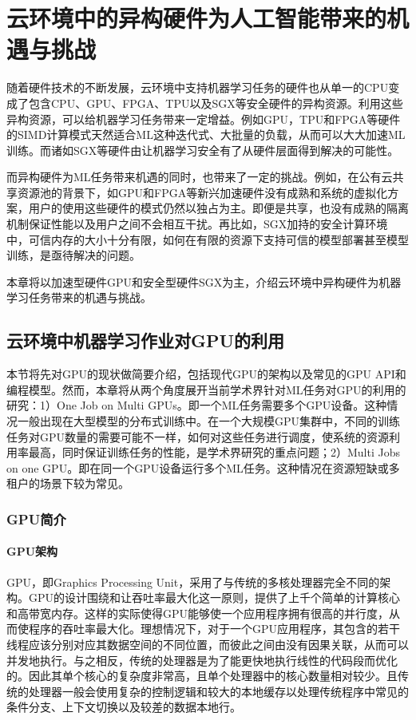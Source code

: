 
\chapter{云环境中的异构硬件为人工智能带来的机遇与挑战}
随着硬件技术的不断发展，云环境中支持机器学习任务的硬件也从单一的CPU变成了包含CPU、GPU、FPGA、TPU以及SGX等安全硬件的异构资源。利用这些异构资源，可以给机器学习任务带来一定增益。例如GPU，TPU和FPGA等硬件的SIMD计算模式天然适合ML这种迭代式、大批量的负载，从而可以大大加速ML训练。而诸如SGX等硬件由让机器学习安全有了从硬件层面得到解决的可能性。

而异构硬件为ML任务带来机遇的同时，也带来了一定的挑战。例如，在公有云共享资源池的背景下，如GPU和FPGA等新兴加速硬件没有成熟和系统的虚拟化方案，用户的使用这些硬件的模式仍然以独占为主。即便是共享，也没有成熟的隔离机制保证性能以及用户之间不会相互干扰。再比如，SGX加持的安全计算环境中，可信内存的大小十分有限，如何在有限的资源下支持可信的模型部署甚至模型训练，是亟待解决的问题。

本章将以加速型硬件GPU和安全型硬件SGX为主，介绍云环境中异构硬件为机器学习任务带来的机遇与挑战。

\section{云环境中机器学习作业对GPU的利用}

本节将先对GPU的现状做简要介绍，包括现代GPU的架构以及常见的GPU API和编程模型。然而，本章将从两个角度展开当前学术界针对ML任务对GPU的利用的研究：1）One Job on Multi GPUs。即一个ML任务需要多个GPU设备。这种情况一般出现在大型模型的分布式训练中。在一个大规模GPU集群中，不同的训练任务对GPU数量的需要可能不一样，如何对这些任务进行调度，使系统的资源利用率最高，同时保证训练任务的性能，是学术界研究的重点问题；2）Multi Jobs on one GPU。即在同一个GPU设备运行多个ML任务。这种情况在资源短缺或多租户的场景下较为常见。

\subsection{GPU简介}

\subsubsection{GPU架构}
GPU，即Graphics Processing Unit，采用了与传统的多核处理器完全不同的架构。GPU的设计围绕和让吞吐率最大化这一原则，提供了上千个简单的计算核心和高带宽内存。这样的实际使得GPU能够使一个应用程序拥有很高的并行度，从而使程序的吞吐率最大化。理想情况下，对于一个GPU应用程序，其包含的若干线程应该分别对应其数据空间的不同位置，而彼此之间由没有因果关联，从而可以并发地执行。与之相反，传统的处理器是为了能更快地执行线性的代码段而优化的。因此其单个核心的复杂度非常高，且单个处理器中的核心数量相对较少。且传统的处理器一般会使用复杂的控制逻辑和较大的本地缓存以处理传统程序中常见的条件分支、上下文切换以及较差的数据本地行。

